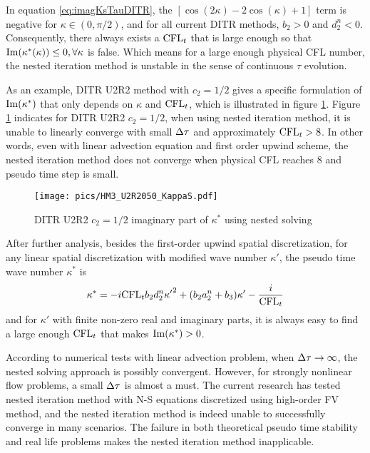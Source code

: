In equation \eqref{eq:imagKsTauDITR},
the $\left[\cos(2\kappa) -2\cos(\kappa) + 1\right]$ term
is negative for $\kappa \in (0, \pi/2)$, and for
all current DITR methods, $b_2>0$ and $d_2^n < 0$.
Consequently, there always exists a $\text{CFL}_t$ that is large enough
so that $\mathrm{Im}(\kappa^*(\kappa)) \leq 0, \forall \kappa$ is false.
Which means for a large enough physical CFL number, the nested
iteration method is unstable in the sense of continuous $\tau$
evolution.

As an example, DITR U2R2 method with $c_2=1/2$ gives
a specific formulation of $\mathrm{Im}(\kappa^*)$ that only depends on $\kappa$
and $\text{CFL}_t$, which is illustrated in figure \ref{fig:HM3_U2R2050_KappaS}.
Figure \ref{fig:HM3_U2R2050_KappaS} indicates for DITR U2R2 $c_2=1/2$,
when using nested iteration method, it is unable to linearly converge
with small ${\Delta} \tau$ and approximately $\text{CFL}_t > 8$.
In other words, even with linear advection equation and first order upwind
scheme,
the nested iteration method does not converge when physical CFL reaches 8
and pseudo time step is small.

\begin{figure}[htbp]
    \centering
    \texttt{[image: pics/HM3\_U2R2050\_KappaS.pdf]}
    \caption[]{DITR U2R2 $c_2=1/2$ imaginary part of $\kappa^*$ using
        nested solving}
    \label{fig:HM3_U2R2050_KappaS}
\end{figure}

After further analysis,
besides the first-order upwind spatial discretization,
for any linear spatial discretization with modified wave number $\kappa'$,
the pseudo time wave number $\kappa^*$ is
\begin{equation}
    \begin{aligned}
        \kappa^* =
        -i\text{CFL}_t b_2 d_2^n {\kappa'}^2
        + (b_2a_2^n + b_3) \kappa' - \frac{i}{\text{CFL}_t}
    \end{aligned}
    \label{eq:imagKsTauDITR_General}
\end{equation}
and for $\kappa'$ with finite non-zero real and imaginary parts,
it is always easy to find a large enough $\text{CFL}_t$ that makes
$\mathrm{Im}(\kappa^*) > 0$.


According to numerical tests with linear advection problem,
when ${\Delta} \tau \rightarrow \infty$, the nested solving
approach is possibly convergent. However, for strongly nonlinear
flow problems, a small ${\Delta} \tau$ is almost a must.
The current research has tested nested iteration method
with N-S equations discretized using high-order FV method,
and the nested iteration method is indeed unable to successfully
converge in many scenarios.
The failure in both theoretical pseudo time stability and
real life problems makes
the nested iteration method inapplicable.

